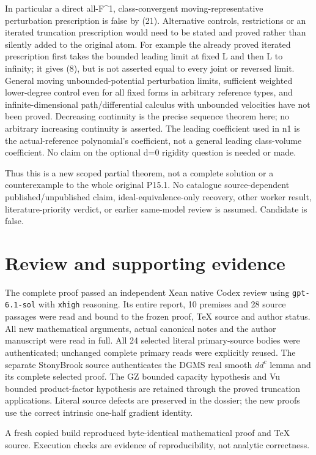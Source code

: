 \documentclass[
]{article}
\begin{document}
In particular a direct all-F\^{}1, class-convergent
moving-representative perturbation prescription is false by (21).
Alternative controls, restrictions or an iterated truncation
prescription would need to be stated and proved rather than silently
added to the original atom. For example the already proved iterated
prescription first takes the bounded leading limit at fixed L and then L
to infinity; it gives (8), but is not asserted equal to every joint or
reversed limit. General moving unbounded-potential perturbation limits,
sufficient weighted lower-degree control even for all fixed forms in
arbitrary reference types, and infinite-dimensional path/differential
calculus with unbounded velocities have not been proved. Decreasing
continuity is the precise sequence theorem here; no arbitrary increasing
continuity is asserted. The leading coefficient used in n1 is the
actual-reference polynomial's coefficient, not a general leading
class-volume coefficient. No claim on the optional d=0 rigidity question
is needed or made.

Thus this is a new scoped partial theorem, not a complete solution or a
counterexample to the whole original P15.1. No catalogue
source-dependent published/unpublished claim, ideal-equivalence-only
recovery, other worker result, literature-priority verdict, or earlier
same-model review is assumed. Candidate is false.

\section*{Review and supporting evidence}

The complete proof passed an independent Xean native Codex review using
\texttt{gpt-6.1-sol} with \texttt{xhigh} reasoning. Its entire report,
10 premises and 28 source passages were read and bound
to the frozen proof, TeX source and author status. All new mathematical
arguments, actual canonical notes and the author manuscript were read in
full. All 24 selected literal primary-source bodies were authenticated;
unchanged complete primary reads were explicitly reused. The separate
StonyBrook source authenticates the DGMS real smooth $dd^c$ lemma and its
complete selected proof. The GZ bounded capacity hypothesis and Vu bounded
product-factor hypothesis are retained through the proved truncation
applications. Literal source defects are preserved in the dossier; the
new proofs use the correct intrinsic one-half gradient identity.

A fresh copied build reproduced byte-identical mathematical proof and
TeX source. Execution checks are evidence of reproducibility, not analytic
correctness.
\end{document}
